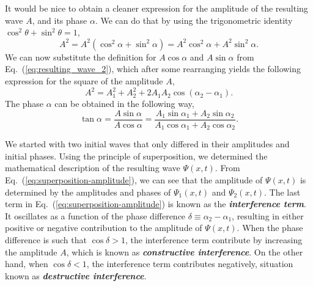 It would be nice to obtain a cleaner expression for the amplitude of the resulting wave $A$, and its phase $\alpha$.
We can do that by using the trigonometric identity $\cos^2\theta + \sin^2\theta=1$,
\begin{equation}
    A^2 = A^2 (\cos^2\alpha + \sin^2\alpha) = A^2\cos^2\alpha + A^2 \sin^2\alpha.
\end{equation}
We can now substitute the definition for $A\cos\alpha$ and $A\sin\alpha$ from Eq.~(\ref{eq:resulting_wave_2}), which after some rearranging yields the following expression for the square of the amplitude $A$,
\begin{equation}
    A^2 = A_1^2 + A_2^2 + 2 A_1 A_2 \cos(\alpha_2-\alpha_1).
    \label{eq:superposition-amplitude}
\end{equation}
The phase $\alpha$ can be obtained in the following way,
\begin{equation}
    \tan \alpha = \frac{A\sin\alpha}{A\cos\alpha} = \frac{A_1\sin\alpha_1 + A_2\sin\alpha_2}{A_1\cos\alpha_1 + A_2\cos\alpha_2}.
    \label{eq:superposition-alpha}
\end{equation}

We started with two initial waves that only differed in their amplitudes and initial phases.
Using the principle of superposition, we determined the mathematical description of the resulting wave $\Psi(x,t)$.
From Eq.~(\ref{eq:superposition-amplitude}), we can see that the amplitude of $\Psi(x,t)$ is determined by the amplitudes and phases of $\Psi_1(x,t)$ and $\Psi_2(x,t)$.
The last term in Eq.~(\ref{eq:superposition-amplitude}) is known as the \textbf{\emph{interference term}}.
It oscillates as a function of the phase difference $\delta\equiv\alpha_2 - \alpha_1$, resulting in either positive or negative contribution to the amplitude of $\Psi(x,t)$.
When the phase difference is such that $\cos\delta>1$, the interference term contribute by increasing the amplitude $A$, which is known as \textbf{\emph{constructive interference}}.
On the other hand, when $\cos\delta<1$, the interference term contributes negatively, situation known as \textbf{\emph{destructive interference}}.

